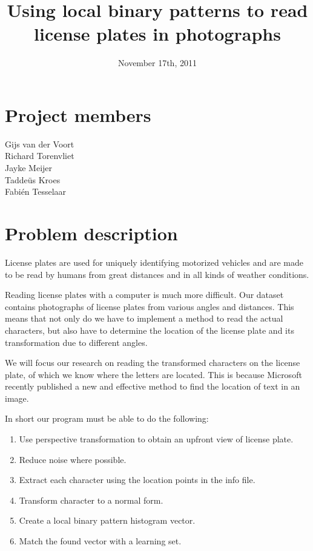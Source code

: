 \documentclass[a4paper]{article}
\title{Using local binary patterns to read license plates in photographs}
\date{November 17th, 2011}
\begin{document}
\maketitle

\section*{Project members}
Gijs van der Voort\\
Richard Torenvliet\\
Jayke Meijer\\
Tadde\"us Kroes\\
Fabi\'en Tesselaar

\tableofcontents
\setcounter{secnumdepth}{1}

\section{Problem description}

License plates are used for uniquely identifying motorized vehicles and are
made to be read by humans from great distances and in all kinds of weather
conditions.

Reading license plates with a computer is much more difficult. Our dataset
contains photographs of license plates from various angles and distances. This
means that not only do we have to implement a method to read the actual
characters, but also have to determine the location of the license plate and
its transformation due to different angles.

We will focus our research on reading the transformed characters on the
license plate, of which we know where the letters are located. This is because
Microsoft recently published a new and effective method to find the location of
text in an image.

In short our program must be able to do the following:

\begin{enumerate}
    \item Use perspective transformation to obtain an upfront view of license
          plate.
    \item Reduce noise where possible.
    \item Extract each character using the location points in the info file.
    \item Transform character to a normal form.
    \item Create a local binary pattern histogram vector.
    \item Match the found vector with a learning set.
\end{enumerate}
\end{document}
